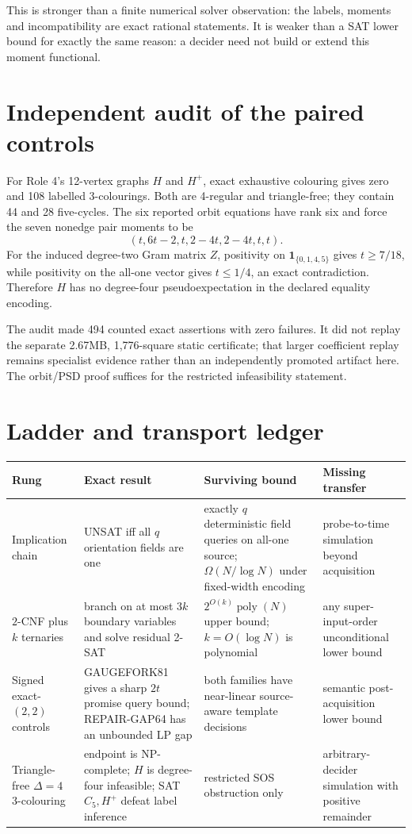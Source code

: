 \documentclass[11pt]{article}
\begin{document}
This is stronger than a finite numerical solver observation: the labels,
moments and incompatibility are exact rational statements.  It is weaker
than a SAT lower bound for exactly the same reason: a decider need not build
or extend this moment functional.

\section{Independent audit of the paired controls}
For Role 4's 12-vertex graphs $H$ and $H^+$, exact exhaustive colouring gives
zero and 108 labelled 3-colourings.  Both are 4-regular and triangle-free;
they contain 44 and 28 five-cycles.  The six reported orbit equations have
rank six and force the seven nonedge pair moments to be
\[
(t,6t-2,t,2-4t,2-4t,t,t).
\]
For the induced degree-two Gram matrix $Z$, positivity on
$\mathbf1_{\{0,1,4,5\}}$ gives $t\ge7/18$, while positivity on the all-one
vector gives $t\le1/4$, an exact contradiction.  Therefore $H$ has no
degree-four pseudoexpectation in the declared equality encoding.

The audit made 494 counted exact assertions with zero failures.  It did not
replay the separate 2.67MB, 1,776-square static certificate; that larger
coefficient replay remains specialist evidence rather than an independently
promoted artifact here.  The orbit/PSD proof suffices for the restricted
infeasibility statement.

\section{Ladder and transport ledger}
\begin{center}\small
\begin{tabular}{p{.20\linewidth}p{.22\linewidth}p{.21\linewidth}p{.24\linewidth}}
\toprule
Rung & Exact result & Surviving bound & Missing transfer\\\midrule
Implication chain & UNSAT iff all $q$ orientation fields are one & exactly
$q$ deterministic field queries on all-one source; $\Omega(N/\log N)$ under
fixed-width encoding & probe-to-time simulation beyond acquisition\\
$2$-CNF plus $k$ ternaries & branch on at most $3k$ boundary variables and
solve residual 2-SAT & $2^{O(k)}\operatorname{poly}(N)$ upper bound;
$k=O(\log N)$ is polynomial & any super-input-order unconditional lower bound\\
Signed exact-$(2,2)$ controls & GAUGEFORK81 gives a sharp $2t$ promise query
bound; REPAIR-GAP64 has an unbounded LP gap & both families have near-linear
source-aware template decisions & semantic post-acquisition lower bound\\
Triangle-free $\Delta=4$ 3-colouring & endpoint is NP-complete; $H$ is
degree-four infeasible; SAT $C_5,H^+$ defeat label inference & restricted SOS
obstruction only & arbitrary-decider simulation with positive remainder\\
\bottomrule
\end{tabular}
\end{center}
\end{document}
